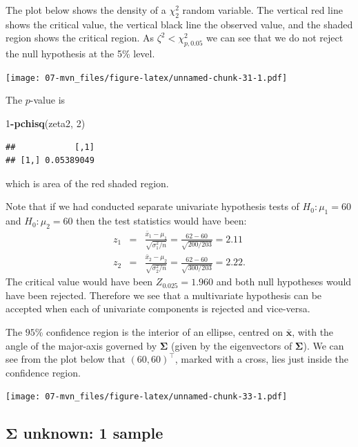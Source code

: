 \documentclass[]{book}
\newenvironment{Shaded}{\begin{snugshade}}{\end{snugshade}}
\newcommand{\DecValTok}[1]{\textcolor[rgb]{0.00,0.00,0.81}{#1}}
\newcommand{\KeywordTok}[1]{\textcolor[rgb]{0.13,0.29,0.53}{\textbf{#1}}}
\newcommand{\NormalTok}[1]{#1}
\newcommand{\OperatorTok}[1]{\textcolor[rgb]{0.81,0.36,0.00}{\textbf{#1}}}
\theoremstyle{definition}
\theoremstyle{definition}
\theoremstyle{definition}
\theoremstyle{remark}
\begin{document}
The plot below shows the density of a \(\chi^2_2\) random variable. The vertical red line shows the critical value, the vertical black line the observed value, and the shaded region shows the critical region. As \(\zeta^2 < \chi^2_{p,0.05}\) we can see that we do not reject the null hypothesis at the 5\% level.

\texttt{[image: 07-mvn\_files/figure-latex/unnamed-chunk-31-1.pdf]}

The \(p\)-value is

\begin{Shaded}
\begin{Highlighting}[]
\DecValTok{1}\OperatorTok{-}\KeywordTok{pchisq}\NormalTok{(zeta2, }\DecValTok{2}\NormalTok{)}
\end{Highlighting}
\end{Shaded}

\begin{verbatim}
##            [,1]
## [1,] 0.05389049
\end{verbatim}

which is area of the red shaded region.

Note that if we had conducted separate univariate hypothesis tests of \(H_0: \mu_1 = 60\) and \(H_0: \mu_2 = 60\) then the test statistics would have been:
\begin{eqnarray*}
z_1 &=& \frac{\bar{x}_1 - \mu_1}{\sqrt{\sigma_1^2/n}} = \frac{62-60}{\sqrt{200/203}} = 2.11  \\
z_2 &=& \frac{\bar{x}_2 - \mu_2}{\sqrt{\sigma_2^2/n}} = \frac{62-60}{\sqrt{300/203}} = 2.22.
\end{eqnarray*}
The critical value would have been \(Z_{0.025} = 1.960\) and both null hypotheses would have been rejected. Therefore we see that a multivariate hypothesis can be accepted when each of univariate components is rejected and vice-versa.

The \(95\)\% confidence region is the interior of an ellipse, centred on \(\bar{\mathbf x}\), with the angle of the major-axis governed by \(\boldsymbol{\Sigma}\) (given by the eigenvectors of \(\boldsymbol{\Sigma}\)). We can see from the plot below that \((60,60)^\top\), marked with a cross, lies just inside the confidence region.

\texttt{[image: 07-mvn\_files/figure-latex/unnamed-chunk-33-1.pdf]}

\hypertarget{onesample}{%
\subsection{\texorpdfstring{\(\boldsymbol{\Sigma}\) unknown: 1 sample}{\textbackslash{}boldsymbol\{\textbackslash{}Sigma\} unknown: 1 sample}}\label{onesample}}
\end{document}
